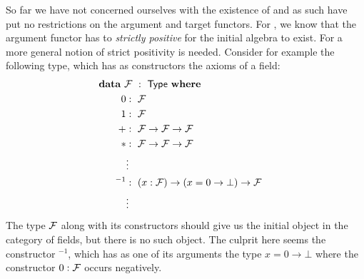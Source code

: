 \documentclass[a4paper,10pt]{report}
\begin{document}
So far we have not concerned ourselves with the existence of \hits and
as such have put no restrictions on the argument and target
functors. For \oits, we know that the argument functor has to
\emph{strictly positive} for the initial algebra to exist. For \hits a
more general notion of strict positivity is needed. Consider for
example the following type, which has as constructors the axioms of a
field:
%
\begin{alignat*}{2}
&\rlap{$\data\ \initialfield\ :\ \Type\ \where$} \\
&&\ \ 0        &:\ \initialfield \\
&&\ \ 1        &:\ \initialfield \\
&&\ \ +        &:\ \initialfield \to \initialfield \to \initialfield \\
&&\ \ *        &:\ \initialfield \to \initialfield \to \initialfield \\
&&&\vdots \\
&&\ \ ^{-1}     &:\ (x : \initialfield) \to (x = 0 \to \bot) \to \initialfield \\
&&&\vdots
\end{alignat*}
%
The type $\mathcal{F}$ along with its constructors should give us
the initial object in the category of fields, but there is no such
object. The culprit here seems the constructor $^{-1}$, which has as
one of its arguments the type $x = 0 \to \bot$ where the constructor
$0 : \mathcal{F}$ occurs negatively.
\end{document}
